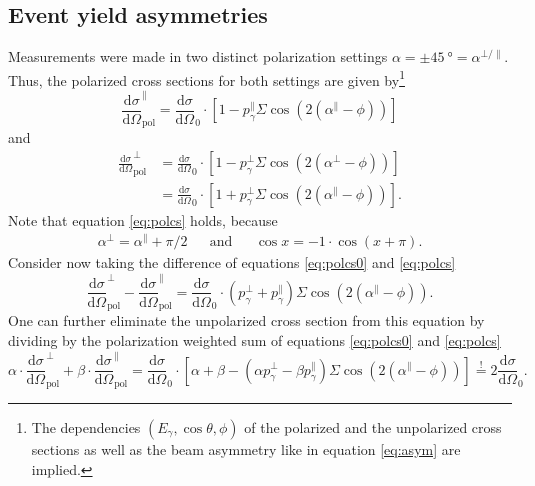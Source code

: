 \subsection{Event yield asymmetries}
\label{subsec:evyield}
Measurements were made in two distinct polarization settings $\alpha=\pm\SI{45}{\degree}=\alpha^{\bot/\parallel}$. Thus, the polarized cross sections for both settings are given by\footnote{The dependencies $\left(E_\gamma,\cos\theta,\phi\right)$ of the polarized and the unpolarized cross sections as well as the beam asymmetry like in equation \eqref{eq:asym} are implied.}
\begin{equation}
	\frac{\text{d}\sigma}{\text{d}\Omega}_\text{pol}^\parallel=\frac{\text{d}\sigma}{\text{d}\Omega}_0\cdot\left[1-p_\gamma^\parallel\Sigma\cos\left(2\left(\alpha^\parallel-\phi\right)\right)\right]
	\label{eq:polcs0}
\end{equation}
and 
\begin{align}
	\frac{\text{d}\sigma}{\text{d}\Omega}_\text{pol}^\bot&=\frac{\text{d}\sigma}{\text{d}\Omega}_0\cdot\left[1-p_\gamma^\bot\Sigma\cos\left(2\left(\alpha^\bot-\phi\right)\right)\right]\label{eq:polcs00}\\
	&=\frac{\text{d}\sigma}{\text{d}\Omega}_0\cdot\left[1+p_\gamma^\bot\Sigma\cos\left(2\left(\alpha^\parallel-\phi\right)\right)\right].\label{eq:polcs}
\end{align}
Note that equation \eqref{eq:polcs} holds, because 
\begin{align*}
	\alpha^\bot=\alpha^\parallel+\pi/2 &&\text{and}&&\cos x = -1\cdot\cos(x+\pi).
\end{align*}
Consider now taking the difference of equations \eqref{eq:polcs0} and \eqref{eq:polcs}
\begin{equation}
	\frac{\text{d}\sigma}{\text{d}\Omega}_\text{pol}^\bot-\frac{\text{d}\sigma}{\text{d}\Omega}_\text{pol}^\parallel=\frac{\text{d}\sigma}{\text{d}\Omega}_0\cdot\left(p_\gamma^\bot+p_\gamma^\parallel\right)\Sigma\cos\left(2\left(\alpha^\parallel-\phi\right)\right).
\end{equation}
One can further eliminate the unpolarized cross section from this equation by dividing by the polarization weighted sum of equations \eqref{eq:polcs0} and \eqref{eq:polcs}
\begin{equation}
	\alpha\cdot\frac{\text{d}\sigma}{\text{d}\Omega}_\text{pol}^\bot+\beta\cdot\frac{\text{d}\sigma}{\text{d}\Omega}_\text{pol}^\parallel=\frac{\text{d}\sigma}{\text{d}\Omega}_0\cdot\left[\alpha+\beta-\left(\alpha p_\gamma^\bot-\beta p_\gamma^\parallel\right)\Sigma\cos\left(2\left(\alpha^\parallel-\phi\right)\right)\right]\overset{!}{=}2\frac{\text{d}\sigma}{\text{d}\Omega}_0.
\end{equation}
